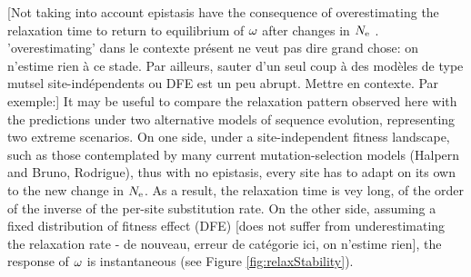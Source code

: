 \documentclass{article}
\begin{document}
	
	[Not taking into account epistasis have the consequence of overestimating the relaxation time to return to equilibrium of $\omega$ after changes in $N_{\mathrm{e}}$ . 'overestimating' dans le contexte présent ne veut pas dire grand chose: on n'estime rien à ce stade. Par ailleurs, sauter d'un seul coup à des modèles de type mutsel site-indépendents ou DFE est un peu abrupt. Mettre en contexte. Par exemple:]
	It may be useful to compare the relaxation pattern observed here with the predictions under two alternative models of sequence evolution, representing two extreme scenarios. On one side, under a site-independent fitness landscape, such as those contemplated by many current mutation-selection models (Halpern and Bruno, Rodrigue), thus with no epistasis, every site has to adapt on its own to the new change in $N_{\mathrm{e}}$. As a result, the relaxation time is vey long, of the order of the inverse of the per-site substitution rate. On the other side, assuming a fixed distribution of fitness effect (DFE) [does not suffer from underestimating the relaxation rate - de nouveau, erreur de catégorie ici, on n'estime rien], the response of $\omega$ is instantaneous (see Figure \ref{fig:relaxStability}).
\end{document}
